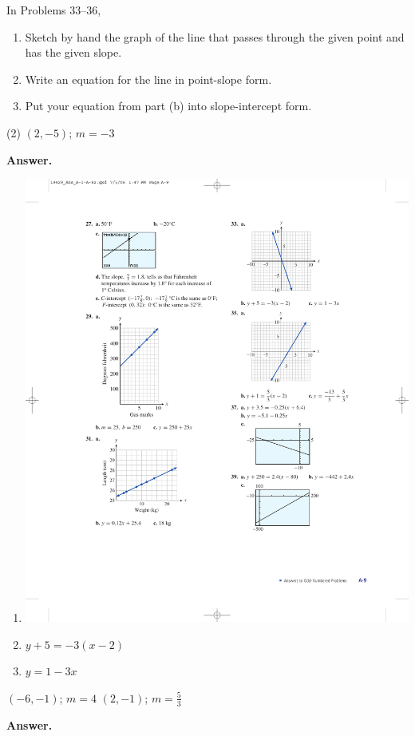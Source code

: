 \documentclass[10pt,]{book}
\theoremstyle{plain}
\theoremstyle{definition}
\theoremstyle{definition}
\theoremstyle{definition}
\theoremstyle{definition}
\numberwithin{equation}{part}
\begin{document}
\begin{exerciselist}
%
\par\smallskip
\hypertarget{exercisegroup-39}{}\par\noindent In Problems 33–36, \leavevmode%
\begin{enumerate}[label=*\alph**]
\item\hypertarget{li-1209}{}Sketch by hand the graph of the line that passes through the given point and has the given slope.%
\item\hypertarget{li-1210}{}Write an equation for the line in point-slope form.%
\item\hypertarget{li-1211}{}Put your equation from part (b) into slope-intercept form.%
\end{enumerate}
%
\begin{exercisegroup}(2)
\exercise[33.]\hypertarget{exercise-319}{}\((2, -5)\); \(m = -3\)%
\par\smallskip
\noindent\textbf{Answer.}\hypertarget{answer-180}{}\quad
\leavevmode%
\begin{enumerate}[label=*\alph**]
\item\hypertarget{li-1212}{}\includegraphics[width=0.5\linewidth]{images/fig-ans-1-5-33}
%
\item\hypertarget{li-1213}{}\(y + 5 = -3(x - 2)\)%
\item\hypertarget{li-1214}{}\(y = 1 - 3x\)%
\end{enumerate}
%
\exercise[34.]\hypertarget{exercise-320}{}\((-6, -1)\); \(m = 4\)%
\exercise[35.]\hypertarget{exercise-321}{}\((2, -1)\); \(m =\frac{5}{3} \)%
\par\smallskip
\noindent\textbf{Answer.}\hypertarget{answer-181}{}\quad
\leavevmode%
\begin{enumerate}[label=*\alph**]

\end{enumerate}
\end{exercisegroup}
\end{exerciselist}
\end{document}

